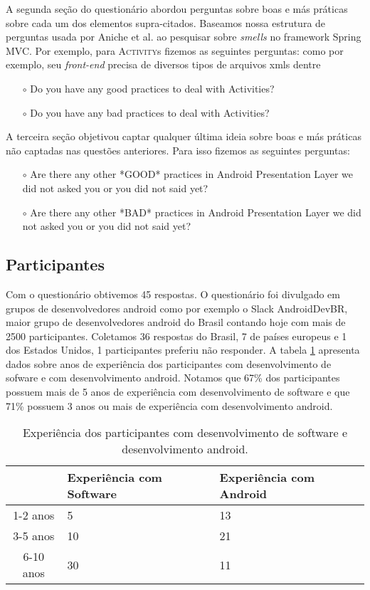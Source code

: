 A segunda se\c{c}\~ao do question\'ario abordou perguntas sobre boas e m\'as pr\'aticas sobre cada um dos elementos supra-citados. Baseamos nossa estrutura de perguntas usada por Aniche et al. ao pesquisar sobre \textit{smells} no framework Spring MVC. Por exemplo, para \textsc{Activity}s fizemos as seguintes perguntas: como por exemplo, seu \textit{front-end} precisa de diversos tipos de arquivos xmls dentre

\begin{itemize} 
	\item[$\circ$] Do you have any good practices to deal with Activities?
	\item[$\circ$] Do you have any bad practices to deal with Activities? 
\end{itemize}

A terceira se\c{c}\~ao objetivou captar qualquer \'ultima ideia sobre boas e m\'as pr\'aticas n\~ao captadas nas quest\~oes anteriores. Para isso fizemos as seguintes perguntas: 

\begin{itemize} 
	\item[$\circ$] Are there any other *GOOD* practices in Android Presentation Layer we did not asked you or you did not said yet?
	\item[$\circ$] Are there any other *BAD* practices in Android Presentation Layer we did not asked you or you did not said yet?
\end{itemize}


\subsection{Participantes}
\label{sub:participantes}

Com o question\'ario obtivemos 45 respostas. O question\'ario foi divulgado em grupos de desenvolvedores android como por exemplo o Slack AndroidDevBR, maior grupo de desenvolvedores android do Brasil contando hoje com mais de 2500 participantes. Coletamos 36 respostas do Brasil, 7 de pa\'ises europeus e 1 dos Estados Unidos, 1 participantes preferiu n\~ao responder. A tabela \ref{tab:DadosDemograficos} apresenta dados sobre anos de experi\^encia dos participantes com desenvolvimento de sofware e com desenvolvimento android. Notamos que 67\% dos participantes possuem mais de 5 anos de experi\^encia com desenvolvimento de software e que 71\% possuem 3 anos ou mais de experi\^encia com desenvolvimento android.

\begin{table}[h]
\centering
\caption{Experi\^encia dos participantes com desenvolvimento de software e desenvolvimento android.}
\begin{tabular}{c|p{2cm}p{2cm}}
& Experi\^encia com Software & Experi\^encia com Android \\
\hline
1-2 anos &	5  &	13 \\
3-5 anos &	10 &	21 \\
6-10 anos &	30 &	11 \\
\end{tabular}
\label{tab:DadosDemograficos}
\end{table}

